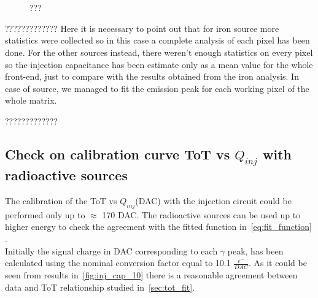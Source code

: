 \begin{figure}
\centering
{}\quad
{}\\
\\
\caption{???}
\label{fig:k_map}
\end{figure} 





?????????????
Here it is necessary to point out that for iron source more statistics were collected so in this case a complete analysis of each pixel has been done. For the other sources instead, there weren't enough statistics on every pixel so the injection capacitance has been estimate only as a mean value for the whole front-end, just to compare with the results obtained from the iron analysis.  
In case of  source, we managed to fit the emission peak for each working pixel of the whole matrix. 

?????????????

\subsection{Check on calibration curve ToT vs $Q_{inj}$ with radioactive sources}

The calibration of the ToT vs $Q_{inj}$(DAC) with the injection circuit could be performed only up to $\approx$ 170 DAC. The radioactive sources can be used up to higher energy to check the agreement with the fitted function in~\autoref{eq:fit_function} .\\
Initially the signal charge in DAC corresponding to each $\gamma$ peak, has been calculated using the nominal conversion factor equal to 10.1 $\frac{e^{-}}{DAC}$. As it could be seen from results in~\autoref{fig:inj_cap_10} there is a reasonable agreement between data and ToT relationship studied in~\autoref{sec:tot_fit}.

